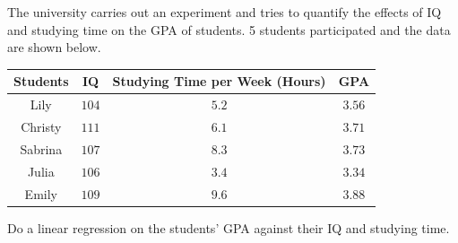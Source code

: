 \begin{exmp}
\label{exmp:GPAregress}
The university carries out an experiment and tries to quantify the effects of IQ and studying time on the GPA of students. 5 students participated and the data are shown below.
\begin{center}
\begin{tabular}{|c|c|c|c|}
\hline
Students & IQ & Studying Time per Week (Hours) & GPA \\
\hline
Lily & $104$ & $5.2$ & $3.56$ \\
\hline
Christy & $111$ & $6.1$ & $3.71$ \\
\hline
Sabrina & $107$ & $8.3$ & $3.73$ \\
\hline
Julia & $106$ & $3.4$ & $3.34$ \\
\hline
Emily & $109$ & $9.6$ & $3.88$ \\
\hline
\end{tabular}
\end{center} 
Do a linear regression on the students' GPA against their IQ and studying time.
\end{exmp}
